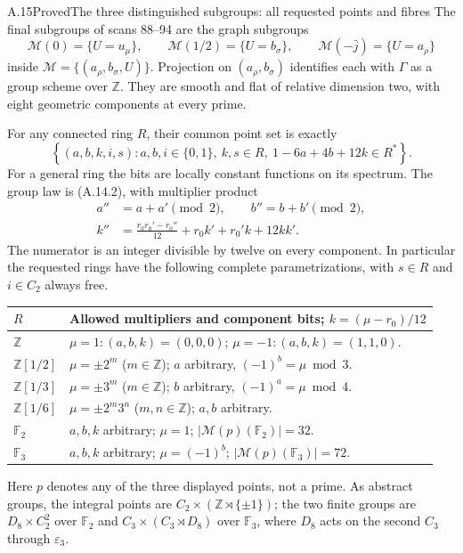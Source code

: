 \begin{statement}{A.15}{Proved}{The three distinguished subgroups: all requested points and fibres}
The final subgroups of scans 88--94 are the graph subgroups
\[
 \mathcal M(0)=\{U=u_{\underline\mu}\},\qquad
 \mathcal M(1/2)=\{U=b_\sigma\},\qquad
 \mathcal M(-\bar j)=\{U=a_\rho\}                 \tag{A.15.1}
\]
inside $\mathcal M=\{(a_\rho,b_\sigma,U)\}$.
Projection on $(a_\rho,b_\sigma)$ identifies each with $\Gamma$ as
a group scheme over $\mathbb Z$. They are smooth and flat of relative
dimension two, with eight geometric components at every prime.

For any connected ring $R$, their common point set is exactly
\[
 \left\{(a,b,k,i,s): a,b,i\in\{0,1\},\ k,s\in R,
           \ 1-6a+4b+12k\in R^*\right\}.          \tag{A.15.2}
\]
For a general ring the bits are locally constant functions on its
spectrum. The group law is (A.14.2), with multiplier product
\[
\begin{split}
 a''&=a+a'\pmod2,\qquad b''=b+b'\pmod2,\\
 k''&=\frac{r_0r_0'-r_0''}{12}
             +r_0k'+r_0'k+12kk'.
\end{split}                                                       \tag{A.15.3}
\]
The numerator is an integer divisible by twelve on every component.
In particular the requested rings have the following complete
parametrizations, with $s\in R$ and $i\in C_2$ always free.
\begin{center}\small
\begin{tabular}{p{.19\linewidth}p{.71\linewidth}}
\toprule
$R$ & Allowed multipliers and component bits; $k=(\mu-r_0)/12$\\\midrule
$\mathbb Z$ & $\mu=1:(a,b,k)=(0,0,0)$; $\mu=-1:(a,b,k)=(1,1,0)$.\\
$\mathbb Z[1/2]$ & $\mu=\pm2^m$ ($m\in\mathbb Z$); $a$ arbitrary,
                   $(-1)^b=\mu\bmod3$.\\
$\mathbb Z[1/3]$ & $\mu=\pm3^m$ ($m\in\mathbb Z$); $b$ arbitrary,
                   $(-1)^a=\mu\bmod4$.\\
$\mathbb Z[1/6]$ & $\mu=\pm2^m3^n$ ($m,n\in\mathbb Z$); $a,b$ arbitrary.\\
$\mathbb F_2$ & $a,b,k$ arbitrary; $\mu=1$;
              $|\mathcal M(p)(\mathbb F_2)|=32$.\\
$\mathbb F_3$ & $a,b,k$ arbitrary; $\mu=(-1)^b$;
              $|\mathcal M(p)(\mathbb F_3)|=72$.\\
\bottomrule
\end{tabular}
\end{center}
Here $p$ denotes any of the three displayed points, not a prime.
As abstract groups, the integral points are
$C_2\times(\mathbb Z\rtimes\{\pm1\})$; the two finite groups are
$D_8\times C_2^2$ over $\mathbb F_2$ and
$C_3\times(C_3\rtimes D_8)$ over $\mathbb F_3$, where $D_8$ acts
on the second $C_3$ through $\varepsilon_3$.
\end{statement}
